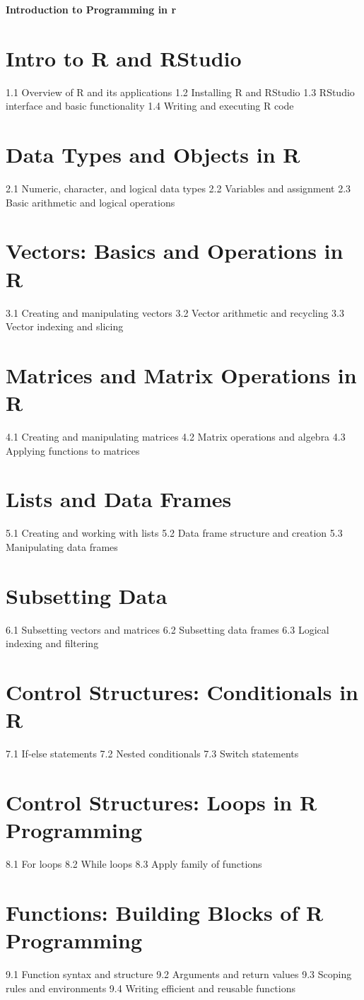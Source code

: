 {\LARGE \bf{Introduction to Programming in r}}
\section{Intro to R and RStudio}
1.1 Overview of R and its applications
1.2 Installing R and RStudio
1.3 RStudio interface and basic functionality
1.4 Writing and executing R code
\section{Data Types and Objects in R}
2.1 Numeric, character, and logical data types
2.2 Variables and assignment
2.3 Basic arithmetic and logical operations
\section{Vectors: Basics and Operations in R}
3.1 Creating and manipulating vectors
3.2 Vector arithmetic and recycling
3.3 Vector indexing and slicing
\section{Matrices and Matrix Operations in R}
4.1 Creating and manipulating matrices
4.2 Matrix operations and algebra
4.3 Applying functions to matrices
\section{Lists and Data Frames}
5.1 Creating and working with lists
5.2 Data frame structure and creation
5.3 Manipulating data frames
\section{Subsetting Data}
6.1 Subsetting vectors and matrices
6.2 Subsetting data frames
6.3 Logical indexing and filtering
\section{Control Structures: Conditionals in R}
7.1 If-else statements
7.2 Nested conditionals
7.3 Switch statements
\section{Control Structures: Loops in R Programming}
8.1 For loops
8.2 While loops
8.3 Apply family of functions
\section{Functions: Building Blocks of R Programming}
9.1 Function syntax and structure
9.2 Arguments and return values
9.3 Scoping rules and environments
9.4 Writing efficient and reusable functions

